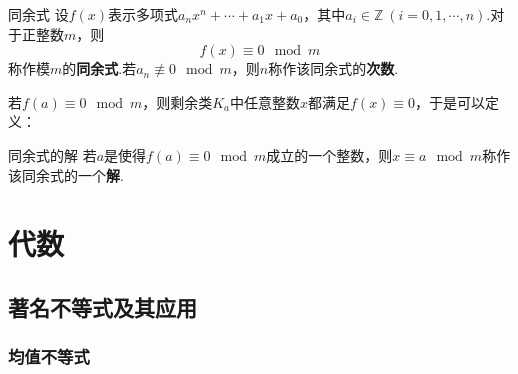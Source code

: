 \documentclass[lang=cn, zihao=5]{elegantbook}
\begin{document}
\begin{definition}{同余式}
	设$f(x)$表示多项式$a_nx^n + \cdots + a_1x + a_0$，其中$a_i \in \mathbb{Z}~(i=0,1,\cdots ,n)$.对于正整数$m$，则$$f(x) \equiv 0 \mod m$$
	称作模$m$的\textbf{同余式}.若$a_n \not\equiv 0 \mod m$，则$n$称作该同余式的\textbf{次数}.
\end{definition}

若$f(a) \equiv 0 \mod m$，则剩余类$K_a$中任意整数$x$都满足$f(x) \equiv 0$，于是可以定义：

\begin{definition}{同余式的解}
	若$a$是使得$f(a) \equiv 0 \mod m$成立的一个整数，则$x \equiv a \mod m$称作该同余式的一个\textbf{解}.
\end{definition}

\part{代数}

\chapter{著名不等式及其应用}

\section{均值不等式}
\end{document}

